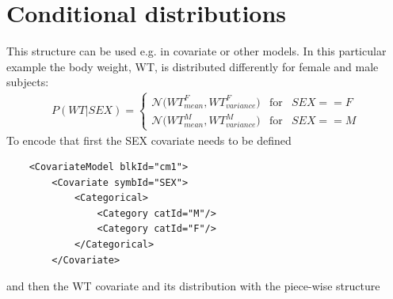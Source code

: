 \section{Conditional distributions}
\label{sec:condDistros}
This structure can be used e.g. in covariate or other models. In this 
particular example the body weight, WT, is distributed differently for female and male subjects: 
\begin{align}
P(WT|SEX) = 
\left\{ \begin{array}{rcl}     
\mathcal N \big(WT^F_{mean}, WT^F_{variance}\big) & \mbox{for} & SEX == F \\  
\mathcal N \big(WT^M_{mean}, WT^M_{variance}\big) & \mbox{for} & SEX == M
\end{array}\right. \nonumber
\end{align}
To encode that first the SEX covariate needs to be defined 
\lstset{language=XML}
\begin{lstlisting}
    <CovariateModel blkId="cm1">
        <Covariate symbId="SEX">
            <Categorical>
                <Category catId="M"/>
                <Category catId="F"/>
            </Categorical>
        </Covariate>
\end{lstlisting}
and then the WT covariate and its distribution with the piece-wise structure
\lstset{language=XML}
